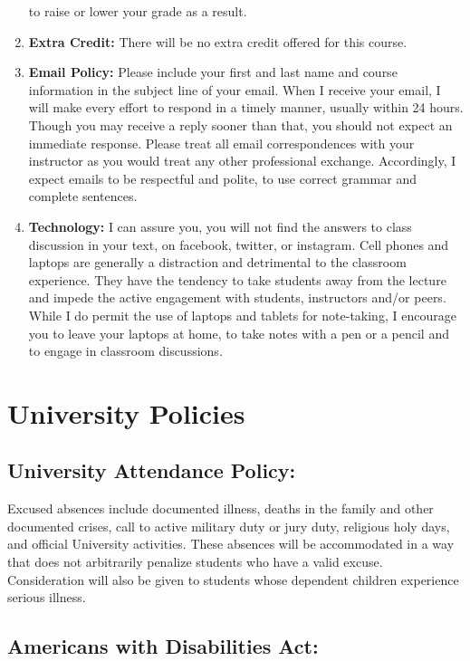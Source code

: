 \documentclass[11pt,]{article}
\begin{document}
\begin{enumerate}
  to raise or lower your grade as a result.
\item
  \textbf{Extra Credit:} There will be no extra credit offered for this
  course.
\item
  \textbf{Email Policy:} Please include your first and last name and
  course information in the subject line of your email. When I receive
  your email, I will make every effort to respond in a timely manner,
  usually within 24 hours. Though you may receive a reply sooner than
  that, you should not expect an immediate response. Please treat all
  email correspondences with your instructor as you would treat any
  other professional exchange. Accordingly, I expect emails to be
  respectful and polite, to use correct grammar and complete sentences.
\item
  \textbf{Technology:} I can assure you, you will not find the answers
  to class discussion in your text, on facebook, twitter, or instagram.
  Cell phones and laptops are generally a distraction and detrimental to
  the classroom experience. They have the tendency to take students away
  from the lecture and impede the active engagement with students,
  instructors and/or peers. While I do permit the use of laptops and
  tablets for note-taking, I encourage you to leave your laptops at
  home, to take notes with a pen or a pencil and to engage in classroom
  discussions.
\end{enumerate}

\hypertarget{university-policies}{%
\section{University Policies}\label{university-policies}}

\hypertarget{university-attendance-policy}{%
\subsection{University Attendance
Policy:}\label{university-attendance-policy}}

Excused absences include documented illness, deaths in the family and
other documented crises, call to active military duty or jury duty,
religious holy days, and official University activities. These absences
will be accommodated in a way that does not arbitrarily penalize
students who have a valid excuse. Consideration will also be given to
students whose dependent children experience serious illness.

\hypertarget{americans-with-disabilities-act}{%
\subsection{Americans with Disabilities
Act:}\label{americans-with-disabilities-act}}
\end{document}
